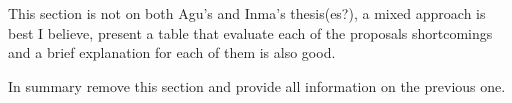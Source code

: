 This section is not on both Agu's and Inma's thesis(es?), a mixed approach is best I believe, present a table that evaluate each of the proposals shortcomings and a brief explanation for each of them is also good.

In summary remove this section and provide all information on the previous one.




